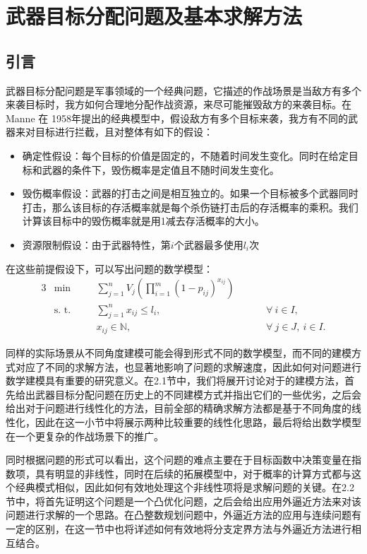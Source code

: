 \chapter{武器目标分配问题及基本求解方法}\label{chap:WTA}

\section{引言}
武器目标分配问题是军事领域的一个经典问题，它描述的作战场景是当敌方有多个来袭目标时，我方如何合理地分配作战资源，来尽可能摧毁敌方的来袭目标。在Manne 在 1958年提出的经典模型中，假设敌方有多个目标来袭，我方有不同的武器来对目标进行拦截，且对整体有如下的假设：
\begin{itemize}
    \item 确定性假设：每个目标的价值是固定的，不随着时间发生变化。同时在给定目标和武器的条件下，毁伤概率是定值且不随时间发生变化。
    \item 毁伤概率假设：武器的打击之间是相互独立的。如果一个目标被多个武器同时打击，那么该目标的存活概率就是每个杀伤链打击后的存活概率的乘积。我们计算该目标中的毁伤概率就是用1减去存活概率的大小。
    \item 资源限制假设：由于武器特性，第$i$个武器最多使用$l_i$次
\end{itemize}
在这些前提假设下，可以写出问题的数学模型：
\begin{alignat}{3}
    &\min\quad && \sum_{j=1}^n V_j \left( \prod_{i=1}^m (1 - p_{ij}) ^ {x_{ij}}  \right) \tag{P1.1} \\ 
    &\text{s. t.}\quad &&\sum_{j=1}^n x_{ij} \leq l_i, \quad &\hspace{1cm}\forall ~ i \in I, \tag{P1.2}\\
    & && x_{ij} \in \mathbb{N}, \quad &\hspace{1cm}\forall ~ j\in J, ~ i \in I. \tag{P1.3}
\end{alignat}


同样的实际场景从不同角度建模可能会得到形式不同的数学模型，而不同的建模方式对应了不同的求解方法，也显著地影响了问题的求解速度，因此如何对问题进行数学建模具有重要的研究意义。在2.1节中，我们将展开讨论对于的建模方法，首先给出武器目标分配问题在历史上的不同建模方式并指出它们的一些优劣，之后会给出对于问题进行线性化的方法，目前全部的精确求解方法都是基于不同角度的线性化，因此在这一小节中将展示两种比较重要的线性化思路，最后将给出数学模型在一个更复杂的作战场景下的推广。

同时根据问题的形式可以看出，这个问题的难点主要在于目标函数中决策变量在指数项，具有明显的非线性，同时在后续的拓展模型中，对于概率的计算方式都与这个经典模式相似，因此如何有效地处理这个非线性项将是求解问题的关键。在2.2节中，将首先证明这个问题是一个凸优化问题，之后会给出应用外逼近方法来对该问题进行求解的一个思路。在凸整数规划问题中，外逼近方法的应用与连续问题有一定的区别，在这一节中也将详述如何有效地将分支定界方法与外逼近方法进行相互结合。

